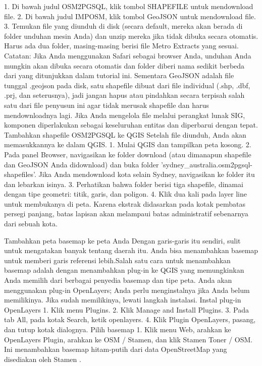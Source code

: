 \begin{enumerate}
1.	Di bawah judul OSM2PGSQL, klik tombol SHAPEFILE untuk mendownload file.
2.	Di bawah judul IMPOSM, klik tombol GeoJSON untuk mendownload file.
3.	Temukan file yang diunduh di disk (secara default, mereka akan berada di folder unduhan mesin Anda) dan unzip mereka jika tidak dibuka secara otomatis. Harus ada dua folder, masing-masing berisi file Metro Extracts yang sesuai.
Catatan: Jika Anda menggunakan Safari sebagai browser Anda, unduhan Anda mungkin akan dibuka secara otomatis dan folder diberi nama sedikit berbeda dari yang ditunjukkan dalam tutorial ini.
Sementara GeoJSON adalah file tunggal .geojson pada disk, satu shapefile dibuat dari file individual (.shp, .dbf, .prj, dan seterusnya), jadi jangan hapus atau pindahkan secara terpisah salah satu dari file penyusun ini agar tidak merusak shapefile dan harus mendownloadnya lagi. Jika Anda mengelola file melalui perangkat lunak SIG, komponen diperlakukan sebagai keseluruhan entitas dan diperbarui dengan tepat.
Tambahkan shapefile OSM2PGSQL ke QGIS
Setelah file diunduh, Anda akan memasukkannya ke dalam QGIS.
1.	Mulai QGIS dan tampilkan peta kosong.
2.	Pada panel Browser, navigasikan ke folder download (atau dimanapun shapefile dan GeoJSON Anda didownload) dan buka folder 'sydney_australia.osm2pgsql-shapefiles'. Jika Anda mendownload kota selain Sydney, navigasikan ke folder itu dan lebarkan isinya.
3.	Perhatikan bahwa folder berisi tiga shapefile, dinamai dengan tipe geometri: titik, garis, dan poligon.
4.	Klik dua kali pada layer line untuk membukanya di peta. Karena ekstrak didasarkan pada kotak pembatas persegi panjang, batas lapisan akan melampaui batas administratif sebenarnya dari sebuah kota.
 
Tambahkan peta basemap ke peta Anda
Dengan garis-garis itu sendiri, sulit untuk mengatakan banyak tentang daerah itu. Anda bisa menambahkan basemap untuk memberi garis referensi lebih.Salah satu cara untuk menambahkan basemap adalah dengan menambahkan plug-in ke QGIS yang memungkinkan Anda memilih dari berbagai penyedia basemap dan tipe peta. Anda akan menggunakan plug-in OpenLayers; Anda perlu menginstalnya jika Anda belum memilikinya. Jika sudah memilikinya, lewati langkah instalasi.
Instal plug-in OpenLayers
1.	Klik menu Plugins.
2.	Klik Manage and Install Plugins.
3.	Pada tab All, pada kotak Search, ketik openlayers.
4.	Klik Plugin OpenLayers, pasang, dan tutup kotak dialognya.
Pilih basemap
1.	Klik menu Web, arahkan ke OpenLayers Plugin, arahkan ke OSM / Stamen, dan klik Stamen Toner / OSM. Ini menambahkan basemap hitam-putih dari data OpenStreetMap yang disediakan oleh Stamen .
 

\end{enumerate}
